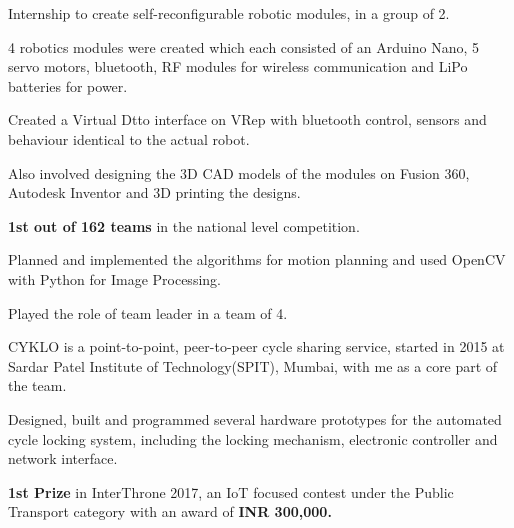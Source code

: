 \documentclass[]{deedy-resume-openfont}
\begin{document}
\begin{minipage}[t]{0.66\textwidth}
\begin{tightemize}
	\item Internship to create self-reconfigurable robotic modules, in a group of 2.
	\item 4 robotics modules were created which each consisted of an Arduino Nano, 5 servo motors, bluetooth, RF modules for wireless communication and LiPo batteries for power.
	\item Created a Virtual Dtto interface on VRep with bluetooth control, sensors and behaviour identical to the actual robot.
	\item Also involved designing the 3D CAD models of the modules on Fusion 360, Autodesk Inventor and 3D printing the designs.
\end{tightemize}
\sectionsep

\begin{tightemize}
\item \textbf{1st out of 162 teams} in the national level competition.
\item Planned and implemented the algorithms for motion planning and used OpenCV with Python for Image Processing.
\item Played the role of team leader in a team of 4. 
\end{tightemize}
\sectionsep

\begin{tightemize}
\item CYKLO is a point-to-point, peer-to-peer cycle sharing service, started in 2015 at Sardar Patel Institute of Technology(SPIT), Mumbai, with me as a core part of the team.
\item Designed, built and programmed several hardware prototypes for the automated cycle locking system, including the locking mechanism, electronic controller and network interface.
\item \textbf{1st Prize} in InterThrone 2017, an IoT focused contest under the Public Transport category with an award of \textbf{INR 300,000.}
\end{tightemize}
\sectionsep


\end{minipage} 

\newpage

\end{document}
